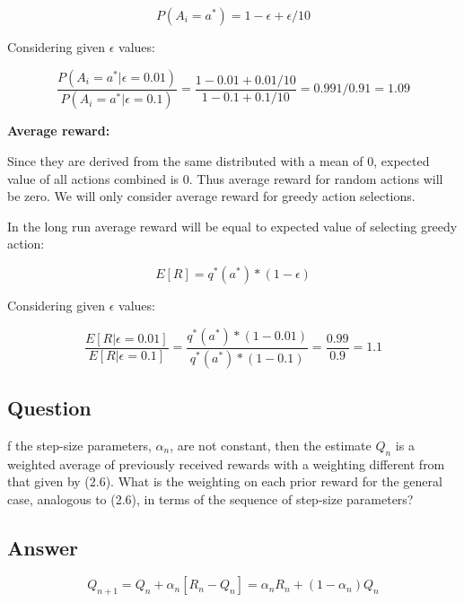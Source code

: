 \documentclass{article}
\begin{document}
    \begin{equation}
        P(A_i=a^*) = 1-\epsilon + \epsilon/10
    \end{equation}

    Considering given $\epsilon$ values:

    \begin{equation}
        \frac{P(A_i=a^*|\epsilon=0.01 ) }{P(A_i=a^*|\epsilon=0.1 ) }= \frac{1-0.01 + 0.01/10}{1-0.1 + 0.1/10} = 0.991 /0.91 = 1.09
    \end{equation}

    \textbf{Average reward:}

    Since they are derived from the same distributed with a mean of 0, expected value of all actions combined is 0.
    Thus average reward for random actions will be zero.
    We will only consider average reward for greedy action selections.

    In the long run average reward will be equal to expected value of selecting greedy action:

    \begin{equation}
        E[R]=q^*(a^*)*(1-\epsilon)
    \end{equation}

    Considering given $\epsilon$ values:

    \begin{equation}
        \frac{E[R|\epsilon=0.01]}{E[R|\epsilon=0.1]} = \frac{q^*(a^*)*(1-0.01)}{q^*(a^*)*(1-0.1)} = \frac{0.99}{0.9} = 1.1
    \end{equation}

    \subsection{Question}
    f the step-size parameters, \(\alpha_n\), are not constant, then the estimate \(Q_n\) is a weighted
    average of previously received rewards with a weighting different from that given by (2.6). What is
    the weighting on each prior reward for the general case, analogous to (2.6), in terms of the sequence of
    step-size parameters?

    \subsection*{Answer}

    \begin{equation}
        Q_{n+1}=Q_{n}+\alpha_{n}[R_n-Q_n]=\alpha_{n}R_n+(1-\alpha_{n})Q_n
    \end{equation}
\end{document}
